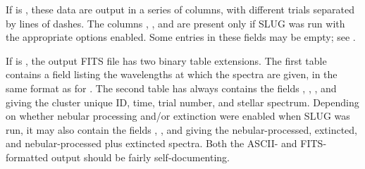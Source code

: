 \documentclass[letterpaper,10pt,english]{sphinxmanual}
\begin{document}
If  is , these data are output in a series of columns, with different trials separated by lines of dashes. The columns , , and  are present only if SLUG was run with the appropriate options enabled. Some entries in these fields may be empty; see {\hyperref[output:ssec-int-spec-file]{\emph{}}}.

If  is , the output FITS file has two binary table extensions. The first table contains a field listing the wavelengths at which the spectra are given, in the same format as for {\hyperref[output:ssec-int-spec-file]{\emph{}}}. The second table has always contains the fields , , , and  giving the cluster unique ID, time, trial number, and stellar spectrum. Depending on whether nebular processing and/or extinction were enabled when SLUG was run, it may also contain the fields , , and  giving the nebular-processed, extincted, and nebular-processed plus extincted spectra. Both the ASCII- and FITS-formatted output should be fairly self-documenting.
\end{document}
